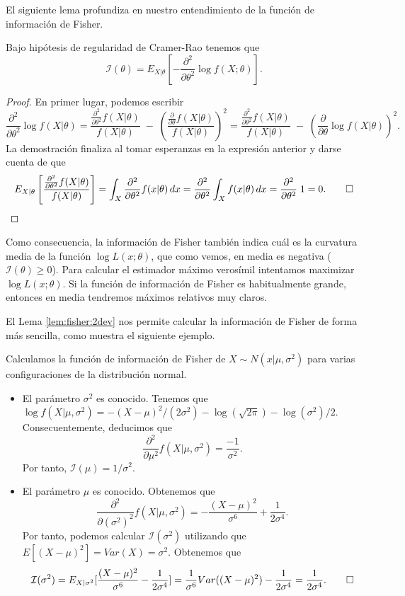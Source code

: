 \documentclass{article}
\begin{document}
    El siguiente lema profundiza en nuestro entendimiento de la función de información de Fisher.

    \begin{lem} \label{lem:fisher:2dev}
        Bajo hipótesis de regularidad de Cramer-Rao tenemos que
        \[\mathcal{I}(\theta) = E_{X|\theta} \left[-\frac{\partial^2}{\partial\theta^2} \log f(X;\theta) \right].\]
    \end{lem}
    \begin{proof}
        En primer lugar, podemos escribir
        \[\frac{\partial^2}{\partial\theta^2} \log f(X|\theta)=\frac{\frac{\partial^2}{\partial\theta^2} f(X|\theta)}{f(X| \theta)}\;-\;\left( \frac{\frac{\partial}{\partial\theta} f(X|\theta)}{f(X| \theta)} \right)^2=\frac{\frac{\partial^2}{\partial\theta^2} f(X|\theta)}{f(X| \theta)}\;-\;\left( \frac{\partial}{\partial\theta} \log f(X|\theta)\right)^2.\]
        La demostración finaliza al tomar esperanzas en la expresión anterior y darse cuenta de que
        \[E_{X|\theta}\left[\frac{\frac{\partial^2}{\partial\theta^2} f(X|\theta)}{f(X| \theta)}\right] = \int_X \frac{\partial^2}{\partial\theta^2} f(x | \theta)\, dx = \frac{\partial^2}{\partial\theta^2} \int_X f(x | \theta)\, dx = \frac{\partial^2}{\partial\theta^2} \; 1 = 0. \qedhere\]
    \end{proof}

    Como consecuencia, la información de Fisher también indica cuál es la curvatura media de la función $\log L(x; \theta)$, que como vemos, en media es negativa ($\mathcal{I}(\theta) \ge 0$). Para calcular el estimador máximo verosímil intentamos maximizar $\log L(x; \theta)$. Si la función de información de Fisher es habitualmente grande, entonces en media tendremos máximos relativos muy claros.

    El Lema \ref{lem:fisher:2dev} nos permite calcular la información de Fisher de forma más sencilla, como muestra el siguiente ejemplo.

    \begin{ex}
        Calculamos la función de información de Fisher de $X \sim N(x|\mu, \sigma^2)$ para varias configuraciones de la distribución normal.
        \begin{itemize}
            \item El parámetro $\sigma^2$ es conocido. Tenemos que $\log f(X|\mu, \sigma^2) = - (X-\mu)^2 / (2\sigma^2) - \log(\sqrt{2\pi}) - \log(\sigma^2)/2$. Consecuentemente, deducimos que \[\frac{\partial^2}{\partial\mu^2} f(X|\mu,\sigma^2) = \frac{-1}{\sigma^2}.\]
            Por tanto, $\mathcal{I}(\mu) = 1 / \sigma^2$.
            \item El parámetro $\mu$ es conocido. Obtenemos que
            \[\frac{\partial^2}{\partial(\sigma^2)^2} f(X|\mu,\sigma^2) = -\frac{(X-\mu)^2}{\sigma^6} + \frac{1}{2\sigma^4}.\]
            Por tanto, podemos calcular $\mathcal{I}(\sigma^2)$ utilizando que $E[(X-\mu)^2] = Var(X) = \sigma^2$. Obtenemos que
            \[\mathcal{I}(\sigma^2) = E_{X|\sigma^2}[\frac{(X-\mu)^2}{\sigma^6} - \frac{1}{2\sigma^4}] = \frac{1}{\sigma^6} Var((X-\mu)^2) - \frac{1}{2\sigma^4} = \frac{1}{2\sigma^4}. \qedhere\]
        \end{itemize}
    \end{ex}
\end{document}
